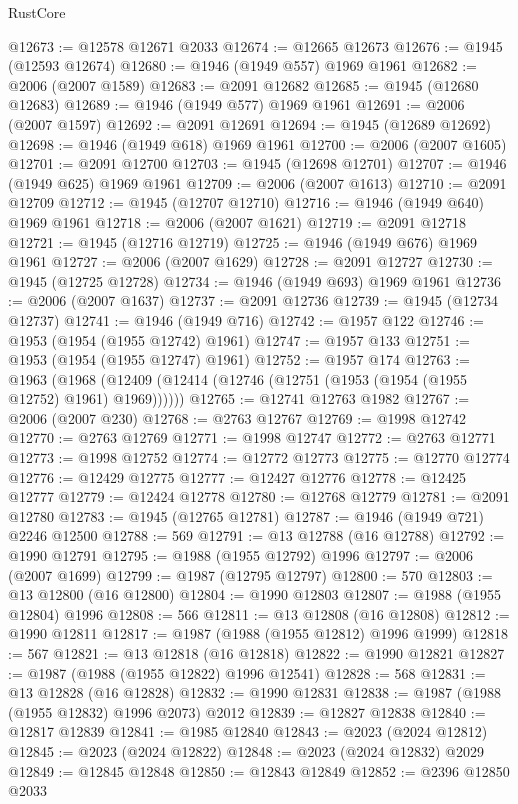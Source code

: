 \begin{lexlean}{RustCore}
\begin{coremodule}
@12673 := @12578 @12671 @2033
@12674 := @12665 @12673
@12676 := @1945 (@12593 @12674)
@12680 := @1946 (@1949 @557) @1969 @1961
@12682 := @2006 (@2007 @1589)
@12683 := @2091 @12682
@12685 := @1945 (@12680 @12683)
@12689 := @1946 (@1949 @577) @1969 @1961
@12691 := @2006 (@2007 @1597)
@12692 := @2091 @12691
@12694 := @1945 (@12689 @12692)
@12698 := @1946 (@1949 @618) @1969 @1961
@12700 := @2006 (@2007 @1605)
@12701 := @2091 @12700
@12703 := @1945 (@12698 @12701)
@12707 := @1946 (@1949 @625) @1969 @1961
@12709 := @2006 (@2007 @1613)
@12710 := @2091 @12709
@12712 := @1945 (@12707 @12710)
@12716 := @1946 (@1949 @640) @1969 @1961
@12718 := @2006 (@2007 @1621)
@12719 := @2091 @12718
@12721 := @1945 (@12716 @12719)
@12725 := @1946 (@1949 @676) @1969 @1961
@12727 := @2006 (@2007 @1629)
@12728 := @2091 @12727
@12730 := @1945 (@12725 @12728)
@12734 := @1946 (@1949 @693) @1969 @1961
@12736 := @2006 (@2007 @1637)
@12737 := @2091 @12736
@12739 := @1945 (@12734 @12737)
@12741 := @1946 (@1949 @716)
@12742 := @1957 @122
@12746 := @1953 (@1954 (@1955 @12742) @1961)
@12747 := @1957 @133
@12751 := @1953 (@1954 (@1955 @12747) @1961)
@12752 := @1957 @174
@12763 := @1963
    (@1968 (@12409 (@12414 (@12746 (@12751 (@1953 (@1954 (@1955 @12752) @1961) @1969))))))
@12765 := @12741 @12763 @1982
@12767 := @2006 (@2007 @230)
@12768 := @2763 @12767
@12769 := @1998 @12742
@12770 := @2763 @12769
@12771 := @1998 @12747
@12772 := @2763 @12771
@12773 := @1998 @12752
@12774 := @12772 @12773
@12775 := @12770 @12774
@12776 := @12429 @12775
@12777 := @12427 @12776
@12778 := @12425 @12777
@12779 := @12424 @12778
@12780 := @12768 @12779
@12781 := @2091 @12780
@12783 := @1945 (@12765 @12781)
@12787 := @1946 (@1949 @721) @2246 @12500
@12788 := 569
@12791 := @13 @12788 (@16 @12788)
@12792 := @1990 @12791
@12795 := @1988 (@1955 @12792) @1996
@12797 := @2006 (@2007 @1699)
@12799 := @1987 (@12795 @12797)
@12800 := 570
@12803 := @13 @12800 (@16 @12800)
@12804 := @1990 @12803
@12807 := @1988 (@1955 @12804) @1996
@12808 := 566
@12811 := @13 @12808 (@16 @12808)
@12812 := @1990 @12811
@12817 := @1987 (@1988 (@1955 @12812) @1996 @1999)
@12818 := 567
@12821 := @13 @12818 (@16 @12818)
@12822 := @1990 @12821
@12827 := @1987 (@1988 (@1955 @12822) @1996 @12541)
@12828 := 568
@12831 := @13 @12828 (@16 @12828)
@12832 := @1990 @12831
@12838 := @1987 (@1988 (@1955 @12832) @1996 @2073) @2012
@12839 := @12827 @12838
@12840 := @12817 @12839
@12841 := @1985 @12840
@12843 := @2023 (@2024 @12812)
@12845 := @2023 (@2024 @12822)
@12848 := @2023 (@2024 @12832) @2029
@12849 := @12845 @12848
@12850 := @12843 @12849
@12852 := @2396 @12850 @2033

\end{coremodule}
\end{lexlean}
